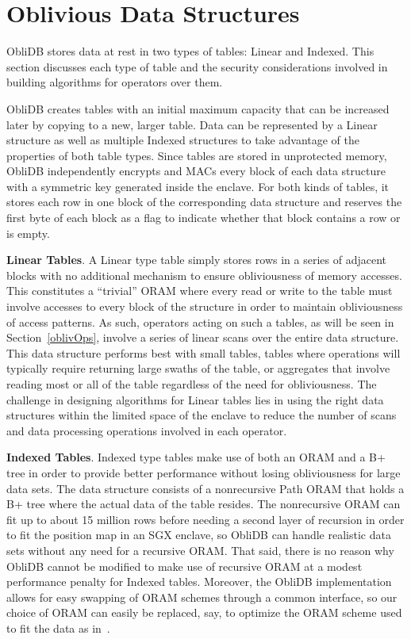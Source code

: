 \documentclass[letterpaper,twocolumn,10pt]{article}
\def\name/{ObliDB}
\begin{document}
\section{Oblivious Data Structures}\label{oblivData}
\name/ stores data at rest in two types of tables: Linear and Indexed. This section discusses each type of table and the security considerations involved in building algorithms for operators over them. 

\name/ creates tables with an initial maximum capacity that can be increased later by copying to a new, larger table. Data can be represented by a Linear structure as well as multiple Indexed structures to take advantage of the properties of both table types. Since tables are stored in unprotected memory, \name/ independently encrypts and MACs every block of each data structure with a symmetric key generated inside the enclave. For both kinds of tables, it stores each row in one block of the corresponding data structure and reserves the first byte of each block as a flag to indicate whether that block contains a row or is empty.

 \noindent \textbf{Linear Tables}. A Linear type table simply stores rows in a series of adjacent blocks with no additional mechanism to ensure obliviousness of memory accesses. This constitutes a ``trivial'' ORAM where every read or write to the table must involve accesses to every block of the structure in order to maintain obliviousness of access patterns. As such, operators acting on such a tables, as will be seen in Section~\ref{oblivOps}, involve a series of linear scans over the entire data structure. This data structure performs best with small tables, tables where operations will typically require returning large swaths of the table, or aggregates that involve reading most or all of the table regardless of the need for obliviousness. The challenge in designing algorithms for Linear tables lies in using the right data structures within the limited space of the enclave to reduce the number of scans and data processing operations involved in each operator. 

 \noindent \textbf{Indexed Tables}. Indexed type tables make use of both an ORAM and a B+ tree in order to provide better performance without losing obliviousness for large data sets. The data structure consists of a nonrecursive Path ORAM that holds a B+ tree where the actual data of the table resides. The nonrecursive ORAM can fit up to about 15 million rows before needing a second layer of recursion in order to fit the position map in an SGX enclave, so \name/ can handle realistic data sets without any need for a recursive ORAM. That said, there is no reason why \name/ cannot be modified to make use of recursive ORAM at a modest performance penalty for Indexed tables. Moreover, the \name/ implementation allows for easy swapping of ORAM schemes through a common interface, so our choice of ORAM can easily be replaced, say, to optimize the ORAM scheme used to fit the data as in~\cite{ZWR+16}.
\end{document}
